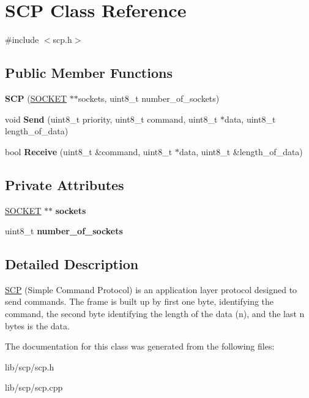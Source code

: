 \hypertarget{class_s_c_p}{}\section{S\+CP Class Reference}
\label{class_s_c_p}


{\ttfamily \#include $<$scp.\+h$>$}

\subsection*{Public Member Functions}
\begin{DoxyCompactItemize}
\item 
{\bfseries S\+CP} (\hyperlink{class_s_o_c_k_e_t}{S\+O\+C\+K\+ET} $\ast$$\ast$sockets, uint8\+\_\+t number\+\_\+of\+\_\+sockets)\hypertarget{class_s_c_p_a9ab03c4d3f03f25c1953b13120ec7b71}{}\label{class_s_c_p_a9ab03c4d3f03f25c1953b13120ec7b71}

\item 
void {\bfseries Send} (uint8\+\_\+t priority, uint8\+\_\+t command, uint8\+\_\+t $\ast$data, uint8\+\_\+t length\+\_\+of\+\_\+data)\hypertarget{class_s_c_p_a02460c47705c42c2ade1608007d7966a}{}\label{class_s_c_p_a02460c47705c42c2ade1608007d7966a}

\item 
bool {\bfseries Receive} (uint8\+\_\+t \&command, uint8\+\_\+t $\ast$data, uint8\+\_\+t \&length\+\_\+of\+\_\+data)\hypertarget{class_s_c_p_ab01a551b8edf803faaea5b0310345498}{}\label{class_s_c_p_ab01a551b8edf803faaea5b0310345498}

\end{DoxyCompactItemize}
\subsection*{Private Attributes}
\begin{DoxyCompactItemize}
\item 
\hyperlink{class_s_o_c_k_e_t}{S\+O\+C\+K\+ET} $\ast$$\ast$ {\bfseries sockets}\hypertarget{class_s_c_p_a0b1f95d779a178ee512c260162b5c9d7}{}\label{class_s_c_p_a0b1f95d779a178ee512c260162b5c9d7}

\item 
uint8\+\_\+t {\bfseries number\+\_\+of\+\_\+sockets}\hypertarget{class_s_c_p_a60870833801da77a079ebed8383c91bf}{}\label{class_s_c_p_a60870833801da77a079ebed8383c91bf}

\end{DoxyCompactItemize}


\subsection{Detailed Description}
\hyperlink{class_s_c_p}{S\+CP} (Simple Command Protocol) is an application layer protocol designed to send commands. The frame is built up by first one byte, identifying the command, the second byte identifying the length of the data (n), and the last n bytes is the data. 

The documentation for this class was generated from the following files\+:\begin{DoxyCompactItemize}
\item 
lib/scp/scp.\+h\item 
lib/scp/scp.\+cpp\end{DoxyCompactItemize}

